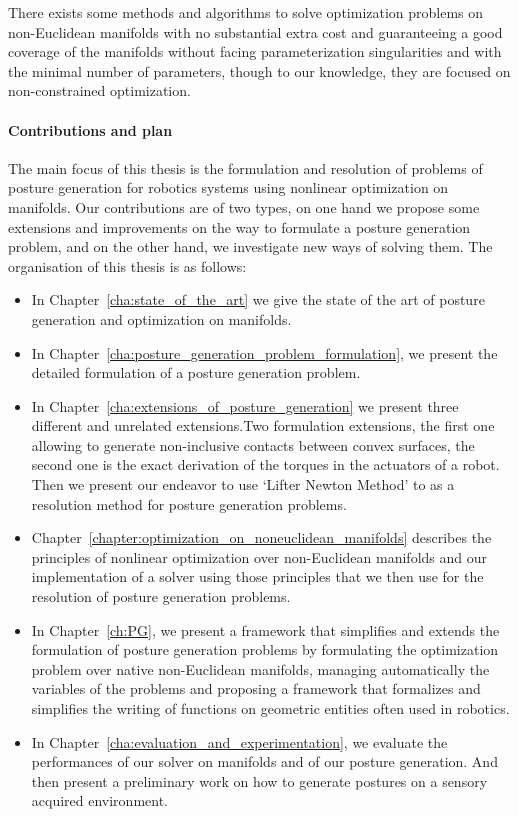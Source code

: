 There exists some methods and algorithms to solve optimization problems on non-Euclidean manifolds with no substantial extra cost and guaranteeing a good coverage of the manifolds without facing parameterization singularities and with the minimal number of parameters, though to our knowledge, they are focused on non-constrained optimization.

\paragraph{Contributions and plan}
The main focus of this thesis is the formulation and resolution of problems of posture generation for robotics systems using nonlinear optimization on manifolds.
Our contributions are of two types, on one hand we propose some extensions and improvements on the way to formulate a posture generation problem, and on the other hand, we investigate new ways of solving them.
The organisation of this thesis is as follows:
\begin{itemize}
  \item In Chapter~\ref{cha:state_of_the_art} we give the state of the art of posture generation and optimization on manifolds.
  \item In Chapter~\ref{cha:posture_generation_problem_formulation}, we present the detailed formulation of a posture generation problem.
  \item In Chapter~\ref{cha:extensions_of_posture_generation} we present three different and unrelated extensions.Two formulation extensions, the first one allowing to generate non-inclusive contacts between convex surfaces, the second one is the exact derivation of the torques in the actuators of a robot. Then we present our endeavor to use `Lifter Newton Method' to as a resolution method for posture generation problems.
  \item Chapter~\ref{chapter:optimization_on_noneuclidean_manifolds} describes the principles of nonlinear optimization over non-Euclidean manifolds and our implementation of a solver using those principles that we then use for the resolution of posture generation problems.
  \item In Chapter~\ref{ch:PG}, we present a framework that simplifies and extends the formulation of posture generation problems by formulating the optimization problem over native non-Euclidean manifolds, managing automatically the variables of the problems and proposing a framework that formalizes and simplifies the writing of functions on geometric entities often used in robotics.
  \item In Chapter~\ref{cha:evaluation_and_experimentation}, we evaluate the performances of our solver on manifolds and of our posture generation. And then present a preliminary work on how to generate postures on a sensory acquired environment.
\end{itemize}


